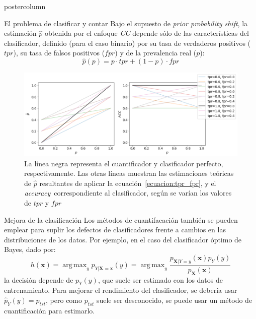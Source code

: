 \documentclass{beamer}
\DeclareMathOperator*{\argmax}{arg\,max}
\begin{document}
\begin{frame}
\begin{columns}
\begin{column}{.57\textwidth}
\begin{beamercolorbox}[center]{postercolumn}
\begin{minipage}{.98\textwidth}
{					\begin{myblock}{El problema de clasificar y contar}
						Bajo el supuesto de {\it prior probability shift\/}, la estimación $\hat p$
						obtenida por el enfoque {\it CC\/} depende sólo de las características
						del clasificador, definido (para el caso binario) por su tasa de verdaderos
						positivos ($tpr$), su tasa de falsos positivos ($fpr$) y de la prevalencia real
						($p$):
						\begin{equation}\label{ecuacion:tpr_fpr}
							\hat p(p) = p \cdot {tpr} + (1-p) \cdot {fpr}
						\end{equation}
						\begin{figure}[h]
							\includegraphics[width=\textwidth]{../plots_teoria/cc_tpr_fpr.png}
							\caption{La línea negra representa el cuantificador y clasificador perfecto,
							respectivamente. Las otras líneas muestran las estimaciones teóricas de
							$\hat p$ resultantes de aplicar la ecuación~\ref{ecuacion:tpr_fpr}, y el
							${\it accuracy\/}$ correspondiente al clasificador, según se varían los
							valores de $tpr$ y $fpr$}
						\end{figure}
					\end{myblock}\vfill

					\begin{myblock}{Mejora de la clasificación}
						Los métodos de cuantifacación también se pueden emplear para suplir los defectos
						de clasificadores frente a cambios en las distribuciones de los datos.
						Por ejemplo, en el caso del clasificador óptimo de Bayes, dado por:
						\begin{equation}\label{ecuacion:bayes}
							h(\boldsymbol{x}) = \argmax_{y} p_{Y|\boldsymbol{X}=\boldsymbol{x}}(y) = \argmax_{y} \frac{p_{\boldsymbol{X}|Y=y}(\boldsymbol{x})p_Y(y)}{p_{\boldsymbol{X}}(\boldsymbol{x})}
						\end{equation}
						la decisión depende de $p_Y(y)$, que suele ser estimado con los datos
						de entrenamiento. Para mejorar el rendimiento del
						clasificador, se debería usar $\hat p_Y(y) = p_{tst}$,
						pero como $p_{tst}$ suele ser desconocido, se puede usar un método de
						cuantificación para estimarlo.
					\end{myblock}\vfill

}
\end{minipage}
\end{beamercolorbox}
\end{column}
\end{columns}
\end{frame}
\end{document}
